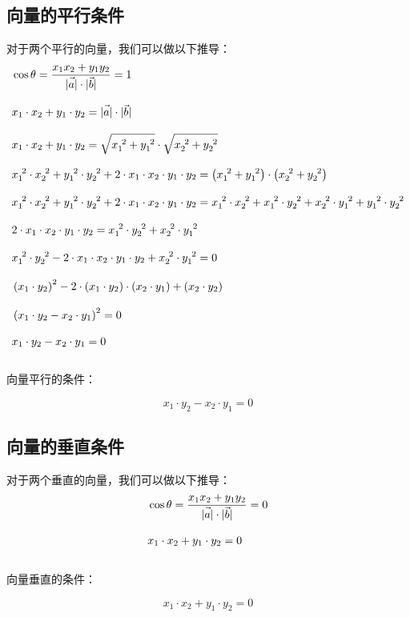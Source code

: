 \documentclass[UTF8]{ctexart}
\let\nvec\vec
\def\vec#1{\nvec{\vphantom b\smash{#1}}}
\begin{document}
\newpage

\subsection{向量的平行条件}
    对于两个平行的向量，我们可以做以下推导：\\
    \setcounter{equation}{0}
    \begin{align}
        &\cos{\theta}=\frac{x_1x_2+y_1y_2}{|\vec{a}|\cdot|\vec{b}|}=1\\[3mm]
        &x_1\cdot x_2+y_1\cdot y_2=|\vec{a}|\cdot|\vec{b}|\\[3mm]
        &x_1\cdot x_2+y_1\cdot y_2=\sqrt{x_1^{~2}+y_1^{~2}}\cdot\sqrt{x_2^{~2}+y_2^{~2}}\\[3mm]
        &x_1^{~2}\cdot x_2^{~2}+y_1^{~2}\cdot y_2^{~2}+2\cdot x_1\cdot x_2\cdot y_1\cdot y_2=\left(x_1^{~2}+y_1^{~2}\right)\cdot\left(x_2^{~2}+y_2^{~2}\right)\\[3mm]
        &x_1^{~2}\cdot x_2^{~2}+y_1^{~2}\cdot y_2^{~2}+2\cdot x_1\cdot x_2\cdot y_1\cdot y_2=x_1^{~2}\cdot x_2^{~2}+x_1^{~2}\cdot y_2^{~2}+x_2^{~2}\cdot y_1^{~2}+y_1^{~2}\cdot y_2^{~2}\\[3mm]
        &2\cdot x_1\cdot x_2\cdot y_1\cdot y_2=x_1^{~2}\cdot y_2^{~2}+x_2^{~2}\cdot y_1^{~2}\\[3mm]
        &x_1^{~2}\cdot y_2^{~2}-2\cdot x_1\cdot x_2\cdot y_1\cdot y_2+x_2^{~2}\cdot y_1^{~2}=0\\[3mm]
        &\left(x_1\cdot y_2\right)^2-2\cdot\left(x_1\cdot y_2\right)\cdot\left(x_2\cdot y_1\right)+\left(x_2\cdot y_2\right)\\[3mm]
        &\left(x_1\cdot y_2-x_2\cdot y_1\right)^2=0\\[3mm]
        &x_1\cdot y_2-x_2\cdot y_1=0
    \end{align}\\
    向量平行的条件：
    \begin{large}
        \begin{equation*}
            x_1\cdot y_2-x_2\cdot y_1=0
        \end{equation*}
    \end{large}

\subsection{向量的垂直条件}
    对于两个垂直的向量，我们可以做以下推导：\\
    \setcounter{equation}{0}
    \begin{align}
        &\cos{\theta}=\frac{x_1x_2+y_1y_2}{|\vec{a}|\cdot|\vec{b}|}=0\\[3mm]
        &x_1\cdot x_2+y_1\cdot y_2=0
    \end{align}\\
    向量垂直的条件：
    \begin{large}
        \begin{equation*}
            x_1\cdot x_2+y_1\cdot y_2=0
        \end{equation*}
    \end{large}
\end{document}
